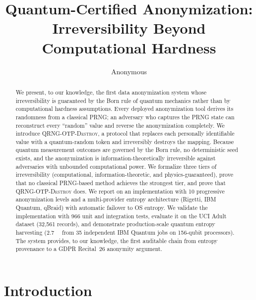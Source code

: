 \documentclass[acmsmall,screen,review,anonymous]{acmart}
\begin{document}
\title{Quantum-Certified Anonymization: Irreversibility Beyond Computational Hardness}

\author{Anonymous}

\begin{abstract}
We present, to our knowledge, the first data anonymization system whose irreversibility is guaranteed by the Born rule of quantum mechanics rather than by computational hardness assumptions. Every deployed anonymization tool derives its randomness from a classical PRNG; an adversary who captures the PRNG state can reconstruct every ``random'' value and reverse the anonymization completely. We introduce \textsc{QRNG-OTP-Destroy}, a protocol that replaces each personally identifiable value with a quantum-random token and irreversibly destroys the mapping. Because quantum measurement outcomes are governed by the Born rule, no deterministic seed exists, and the anonymization is information-theoretically irreversible against adversaries with unbounded computational power. We formalize three tiers of irreversibility (computational, information-theoretic, and physics-guaranteed), prove that no classical PRNG-based method achieves the strongest tier, and prove that \textsc{QRNG-OTP-Destroy} does. We report on an implementation with 10 progressive anonymization levels and a multi-provider entropy architecture (Rigetti, IBM Quantum, qBraid) with automatic failover to OS entropy. We validate the implementation with 966 unit and integration tests, evaluate it on the UCI Adult dataset (32,561 records), and demonstrate production-scale quantum entropy harvesting (\SI{2.7}{\mega\byte} from 35 independent IBM Quantum jobs on 156-qubit processors). The system provides, to our knowledge, the first auditable chain from entropy provenance to a GDPR Recital~26 anonymity argument.
\end{abstract}

\maketitle

\section{Introduction}
\label{sec:intro}
\end{document}
